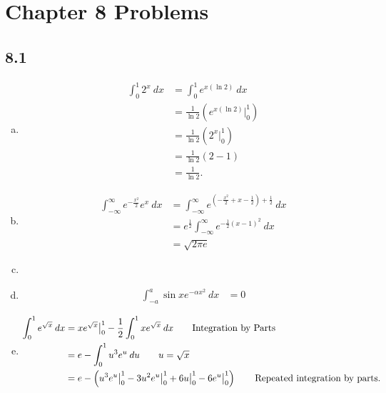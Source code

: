 \documentclass[10pt]{mypackage}
\begin{document}
\RaggedRight
\section{Chapter 8 Problems}%

\subsection{8.1}%
\begin{enumerate}[(a)]
  \item 
    \begin{align*}
      \int_{0}^{1} 2^x\:dx &= \int_{0}^{1} e^{x\left(\ln 2\right)}\:dx\\
                           &= \frac{1}{\ln 2}\left(e^{x\left(\ln 2\right)}\bigr\vert_{0}^{1}\right)\tag*{$u = x\left(\ln 2\right)$}\\
                           &= \frac{1}{\ln 2}\left(2^{x}\bigr\vert_{0}^{1}\right)\\
                           &= \frac{1}{\ln 2}\left(2-1\right)\\
                           &= \frac{1}{\ln 2}.
    \end{align*}
  \item
    \begin{align*}
      \int_{-\infty}^{\infty} e^{-\frac{x^2}{2}}e^{x}\:dx &= \int_{-\infty}^{\infty} e^{\left(-\frac{x^2}{2} + x - \frac{1}{2} \right)+ \frac{1}{2}}\:dx\tag*{Completing the square.}\\
                                                          &= e^{\frac{1}{2}}\int_{-\infty}^{\infty}e^{-\frac{1}{2}\left(x-1\right)^2} \:dx\\
                                                          &= \sqrt{2\pi e}\tag*{Gaussian Integral}
    \end{align*}
  \item 
  \item 
    \begin{align*}
      \int_{-a}^{a} \sin x e^{-\alpha x^2}\:dx &= 0 \tag*{Even/odd.}
    \end{align*}
  \item 
    \begin{align*}
      \int_{0}^{1} e^{\sqrt{x}}\:dx &= xe^{\sqrt{x}}\bigr\vert_{0}^{1} - \frac{1}{2}\int_{0}^{1} xe^{\sqrt{x}}\:dx\tag*{Integration by Parts}\\
                                    &= e - \int_{0}^{1} u^3e^{u}\:du\tag*{$u = \sqrt{x}$}\\
                                    &= e - \left(u^3e^{u}\bigr\vert_{0}^{1} - 3u^2e^{u}\bigr\vert_{0}^{1} + 6u\bigr\vert_{0}^{1} - 6e^{u}\bigr\vert_{0}^{1}\right)\tag*{Repeated integration by parts.}\\

\end{align*}
\end{enumerate}
\end{document}
